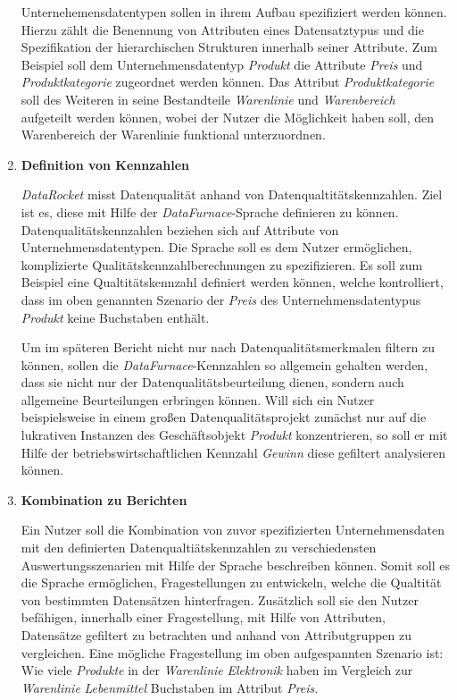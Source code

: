 \documentclass[
  language=german, %
  type=bachelor,%
  ngerman
]{isthesis}
\begin{document}
\begin{content}
\begin{enumerate}
        Unternehemensdatentypen sollen in ihrem Aufbau spezifiziert werden
        können. Hierzu zählt die Benennung von Attributen eines Datensatztypus
        und die Spezifikation der hierarchischen Strukturen innerhalb seiner
        Attribute. Zum Beispiel soll dem Unternehmensdatentyp \textit{Produkt}
        die Attribute \textit{Preis} und \textit{Produktkategorie} zugeordnet
        werden können. Das Attribut \textit{Produktkategorie} soll des Weiteren
        in seine Bestandteile \textit{Warenlinie} und \textit{Warenbereich}
        aufgeteilt werden können, wobei der Nutzer die Möglichkeit haben soll,
        den Warenbereich der Warenlinie funktional unterzuordnen.

      \item \textbf{Definition von Kennzahlen} 

        \textit{DataRocket} misst Datenqualität anhand von
        Datenqualtitätskennzahlen. Ziel ist es, diese mit Hilfe der
        \textit{DataFurnace}-Sprache definieren zu können.
        Datenqualitätskennzahlen beziehen sich auf Attribute von
        Unternehmensdatentypen. Die Sprache soll es dem Nutzer ermöglichen,
        komplizierte Qualitätskennzahlberechnungen zu spezifizieren. Es
        soll zum Beispiel eine Qualtitätskennzahl definiert werden können,
        welche kontrolliert, dass im oben genannten Szenario der \textit{Preis}
        des Unternehmensdatentypus \textit{Produkt} keine Buchstaben enthält.

        Um im späteren Bericht nicht nur nach Datenqualitätsmerkmalen filtern
        zu können, sollen die \textit{DataFurnace}-Kennzahlen so allgemein
        gehalten werden, dass sie nicht nur der Datenqualitätsbeurteilung
        dienen, sondern auch allgemeine Beurteilungen erbringen können. Will
        sich ein Nutzer beispielsweise in einem großen Datenqualitätsprojekt
        zunächst nur auf die lukrativen Instanzen des Geschäftsobjekt
        \textit{Produkt} konzentrieren, so soll er mit Hilfe der
        betriebswirtschaftlichen Kennzahl \textit{Gewinn} diese gefiltert
        analysieren können.
        
      \item \textbf{Kombination zu Berichten}

        Ein Nutzer soll die Kombination von zuvor spezifizierten
        Unternehmensdaten mit den definierten Datenqualtiätskennzahlen zu
        verschiedensten Auswertungsszenarien mit Hilfe der Sprache beschreiben
        können. Somit soll es die Sprache ermöglichen, Fragestellungen zu
        entwickeln, welche die Qualtität von bestimmten Datensätzen hinterfragen.
        Zusätzlich soll sie den Nutzer befähigen, innerhalb einer
        Fragestellung, mit Hilfe von Attributen, Datensätze gefiltert zu
        betrachten und anhand von Attributgruppen zu vergleichen. Eine mögliche
        Fragestellung im oben aufgespannten Szenario ist: Wie viele
        \textit{Produkte} in der \textit{Warenlinie} \textit{Elektronik} haben
        im Vergleich zur \textit{Warenlinie} \textit{Lebenmittel} Buchstaben im
        Attribut \textit{Preis}.
    \end{enumerate}


\end{content}
\end{document}
